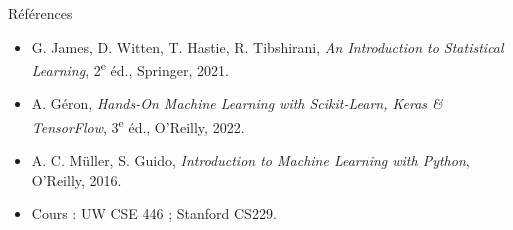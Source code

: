 \documentclass[aspectratio=169,11pt]{beamer}
\begin{document}
\begin{frame}{Références}
\begin{itemize}\small
  \item G. James, D. Witten, T. Hastie, R. Tibshirani, \emph{An Introduction to Statistical Learning}, 2\textsuperscript{e} éd., Springer, 2021.
  \item A. Géron, \emph{Hands-On Machine Learning with Scikit-Learn, Keras \& TensorFlow}, 3\textsuperscript{e} éd., O'Reilly, 2022.
  \item A. C. Müller, S. Guido, \emph{Introduction to Machine Learning with Python}, O'Reilly, 2016.
  \item Cours : UW CSE 446 ; Stanford CS229.
\end{itemize}
\end{frame}
\end{document}
